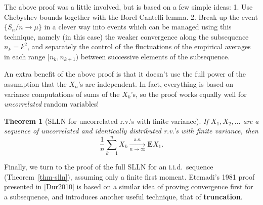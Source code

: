 \documentclass[12pt]{article}
\newtheorem{thm}{Theorem}[section]
\newcommand{\expec}{\mathbf{E}}
\theoremstyle{example}
\begin{document}
The above proof was a little involved, but is based on a few simple ideas: 1. Use Chebyshev bounds together with the Borel-Cantelli lemma. 2. Break up the event $\{S_n/n\to \mu\}$ in a clever way into events which can be managed using this technique, namely (in this case) the weaker convergence along the subsequence $n_k = k^2$, and separately the control of the fluctuations of the empirical averages in each range $[n_k,n_{k+1})$ between successive elements of the subsequence.

An extra benefit of the above proof is that it doesn't use the full power of the assumption that the $X_n$'s are independent. In fact, everything is based on variance computations of sums of the $X_k$'s, so the proof works equally well for \emph{uncorrelated} random variables!

\begin{thm}[SLLN for uncorrelated r.v.'s with finite variance] If $X_1,X_2,\ldots$ are a sequence of uncorrelated and identically distributed r.v.'s with finite variance, then
$$
\frac{1}{n}\sum_{k=1}^n X_k \xrightarrow[n\to\infty]{\textrm{a.s.}} \expec X_1.
$$
\end{thm}

Finally, we turn to the proof of the full SLLN for an i.i.d.\ sequence (Theorem~\ref{thm-slln}), assuming only a finite first moment. Etemadi's 1981 proof presented in [Dur2010] is based on a similar idea of proving convergence first for a subsequence, and introduces another useful technique, that of \textbf{truncation}.
\end{document}
